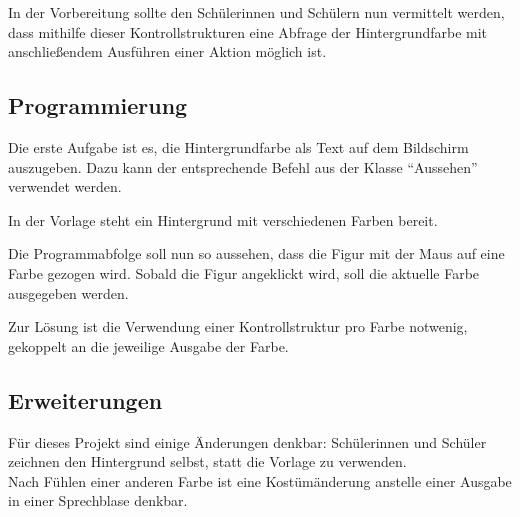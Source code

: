 In der Vorbereitung sollte den Schülerinnen und Schülern nun vermittelt
werden, dass mithilfe dieser Kontrollstrukturen eine Abfrage der
Hintergrundfarbe mit anschließendem Ausführen einer Aktion möglich ist.

\subsection{Programmierung}\label{programmierung}

Die erste Aufgabe ist es, die Hintergrundfarbe als Text auf dem
Bildschirm auszugeben. Dazu kann der entsprechende Befehl aus der Klasse
``Aussehen'' verwendet werden.

In der Vorlage steht ein Hintergrund mit verschiedenen Farben bereit.

Die Programmabfolge soll nun so aussehen, dass die Figur mit der Maus
auf eine Farbe gezogen wird. Sobald die Figur angeklickt wird, soll die
aktuelle Farbe ausgegeben werden.

Zur Lösung ist die Verwendung einer Kontrollstruktur pro Farbe notwenig,
gekoppelt an die jeweilige Ausgabe der Farbe.

\subsection{Erweiterungen}\label{erweiterungen}

Für dieses Projekt sind einige Änderungen denkbar: Schülerinnen und
Schüler zeichnen den Hintergrund selbst, statt die Vorlage zu
verwenden.\\
Nach Fühlen einer anderen Farbe ist eine Kostümänderung anstelle einer
Ausgabe in einer Sprechblase denkbar.
